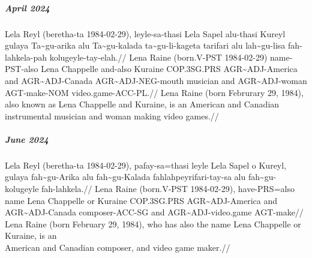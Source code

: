 \subparagraph*{April 2024}
\ex
\begingl
\gla Lela Reyl   (beretha-ta 1984-02-29),   leyle-sa-thasi Lela Sapel      alu-thasi Kureyl gulaya       Ta\~{}gu-arika     alu Ta\~{}gu-kalada   ta\~{}gu-li-kageta   tarifari alu lah\~{}gu-lisa   fah-lahkela-pah kolugeyle-tay-elah.//
\glb Lena Raine  (born.V-PST 1984-02-29)    name-PST-also  Lena Chappelle  and-also  Kuraine COP.3SG.PRS AGR\~{}ADJ-America and AGR\~{}ADJ-Canada AGR\~{}ADJ-NEG-mouth musician and AGR\~{}ADJ-woman AGT-make-NOM    video.game-ACC-PL.//
\glft Lena Raine  (born Februrary 29, 1984), also known as Lena Chappelle and Kuraine, is an American and Canadian instrumental musician and woman making video games.//
\endgl
\xe

\subparagraph*{June 2024}
\ex
\begingl
\gla Lela Reyl  (beretha-ta 1984-02-29), pafay-sa=thasi leyle Lela Sapel     o  Kureyl, gulaya      fah\~{}gu-Arika    alu fah\~{}gu-Kalada  fahlahpeyrifari-tay-sa alu fah\~{}gu-kolugeyle   fah-lahkela.//
\glb Lena Raine (born.V-PST 1984-02-29), have-PRS=also  name  Lena Chappelle or Kuraine COP.3SG.PRS AGR\~{}ADJ-America and AGR\~{}ADJ-Canada composer-ACC-SG        and AGR\~{}ADJ-video.game AGT-make//
\glft Lena Raine (born February 29, 1984), who has also the name Lena Chappelle or Kuraine, is an \\American and Canadian composer, and video game maker.//
\endgl
\xe

	
